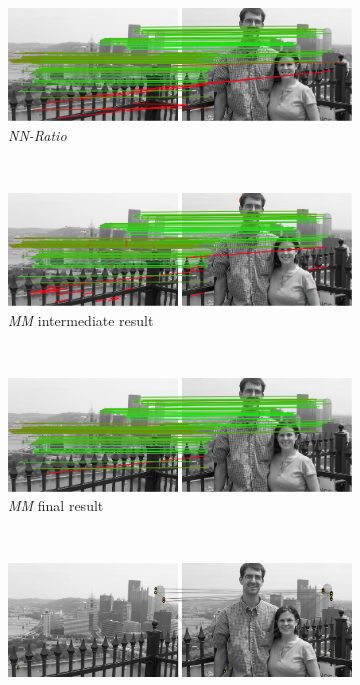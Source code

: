 \documentclass[conference]{IEEEtran}
\begin{document}
\begin{figure}
\begin{subfigure}[t]{\columnwidth}
			\centering
			\includegraphics[width=0.85\columnwidth]{images/mirror_match_off}
            \caption{\emph{NN-Ratio}}
			\label{fig:unique}
		\end{subfigure}%
        \\ %
        \begin{subfigure}[t]{\columnwidth}
			\centering
			\includegraphics[width=0.85\columnwidth]{images/mirror_match_with_pruned}
			\caption{\emph{MM} intermediate result}
			\label{fig:within}
		\end{subfigure}%
		\\ %
        \begin{subfigure}[t]{\columnwidth}
			\centering
			\includegraphics[width=0.85\columnwidth]{images/mirror_match}
			\caption{\emph{MM} final result}
			\label{fig:without}
		\end{subfigure}%
		\\ %
		\begin{subfigure}[t]{\columnwidth}
			\centering
			\includegraphics[width=0.85\columnwidth]{images/MMC_partition}

\end{subfigure}
\end{figure}
\end{document}
